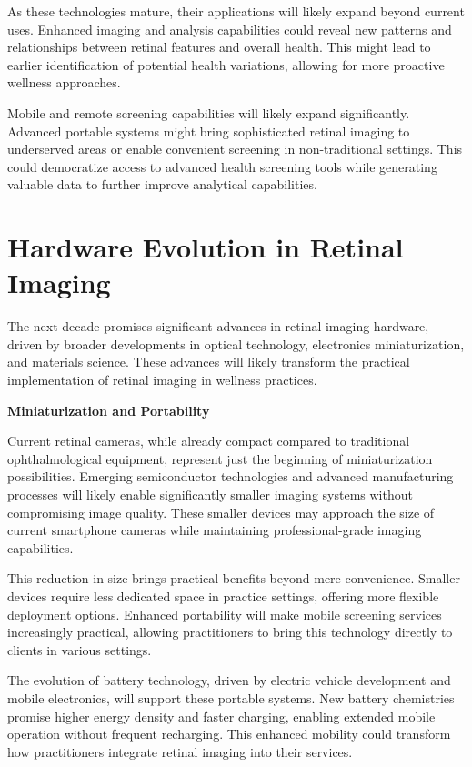 \documentclass[
  Letterpaper,
]{scrbook}
\begin{document}
As these technologies mature, their applications will likely expand
beyond current uses. Enhanced imaging and analysis capabilities could
reveal new patterns and relationships between retinal features and
overall health. This might lead to earlier identification of potential
health variations, allowing for more proactive wellness approaches.

Mobile and remote screening capabilities will likely expand
significantly. Advanced portable systems might bring sophisticated
retinal imaging to underserved areas or enable convenient screening in
non-traditional settings. This could democratize access to advanced
health screening tools while generating valuable data to further improve
analytical capabilities.

\section{Hardware Evolution in Retinal
Imaging}\label{hardware-evolution-in-retinal-imaging}

The next decade promises significant advances in retinal imaging
hardware, driven by broader developments in optical technology,
electronics miniaturization, and materials science. These advances will
likely transform the practical implementation of retinal imaging in
wellness practices.

\textbf{Miniaturization and Portability}

Current retinal cameras, while already compact compared to traditional
ophthalmological equipment, represent just the beginning of
miniaturization possibilities. Emerging semiconductor technologies and
advanced manufacturing processes will likely enable significantly
smaller imaging systems without compromising image quality. These
smaller devices may approach the size of current smartphone cameras
while maintaining professional-grade imaging capabilities.

This reduction in size brings practical benefits beyond mere
convenience. Smaller devices require less dedicated space in practice
settings, offering more flexible deployment options. Enhanced
portability will make mobile screening services increasingly practical,
allowing practitioners to bring this technology directly to clients in
various settings.

The evolution of battery technology, driven by electric vehicle
development and mobile electronics, will support these portable systems.
New battery chemistries promise higher energy density and faster
charging, enabling extended mobile operation without frequent
recharging. This enhanced mobility could transform how practitioners
integrate retinal imaging into their services.
\end{document}
